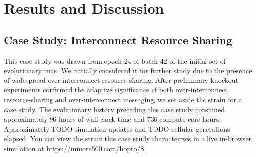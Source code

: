 \section{Results and Discussion} \label{sec:results}









% 

\subsection{Case Study: Interconnect Resource Sharing}



This case study was drawn from epoch 24 of batch 42 of the initial set of evolutionary runs.
We initially considered it for further study due to the presence of widespread over-interconnect resource sharing.
After preliminary knockout experiments confirmed the adaptive significance of both over-interconnect resource-sharing and over-interconnect messaging, we set aside the strain for a case study.
The evolutionary history preceding this case study consumed approximately 96 hours of wall-clock time and 736 compute-core hours.
Approximately TODO simulation updates and TODO cellular generations elapsed.
You can view the strain this case study characterizes in a live in-browser simulation at \url{https://mmore500.com/hopto/8}

